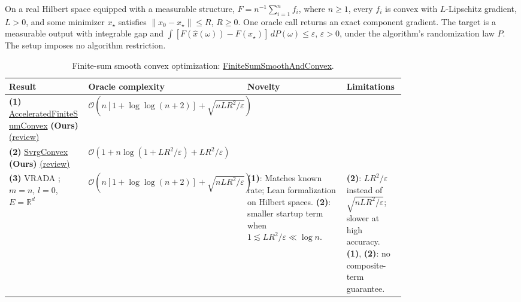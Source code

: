 \begin{table}[tp]
\centering
\caption{Finite-sum smooth convex optimization: \href{https://github.com/k3nfalt/longtails/blob/main/LongTails/Setups/FiniteSumSmoothAndConvex.lean}{FiniteSumSmoothAndConvex}.}\label{tab:FiniteSumSmoothAndConvex}
\parbox{\linewidth}{\footnotesize On a real Hilbert space equipped with a measurable structure, $F=n^{-1}\sum_{i=1}^n f_i$, where $n\ge1$, every $f_i$ is convex with $L$-Lipschitz gradient, $L>0$, and some minimizer $x_\star$ satisfies $\|x_0-x_\star\|\le R$, $R\ge0$. One oracle call returns an exact component gradient. The target is a measurable output with integrable gap and $\int [F(\widehat x(\omega))-F(x_\star)]\,dP(\omega)\le\varepsilon$, $\varepsilon>0$, under the algorithm's randomization law $P$. The setup imposes no algorithm restriction.}\par\smallskip
\begin{threeparttable}
\footnotesize
\setlength{\tabcolsep}{4pt}\renewcommand{\arraystretch}{1.25}
\begin{tabularx}{\linewidth}{@{}>{\raggedright\arraybackslash}p{0.20\linewidth}>{\raggedright\arraybackslash}p{0.32\linewidth}>{\raggedright\arraybackslash}p{0.25\linewidth}>{\raggedright\arraybackslash}X@{}}
\toprule
\textbf{Result} & \textbf{Oracle complexity} & \textbf{Novelty} & \textbf{Limitations} \\
\midrule
\textbf{(1)} \href{https://github.com/k3nfalt/longtails/blob/main/LongTails/Theorems/AcceleratedFiniteSumConvex.lean}{Accelerated\allowbreak Finite\allowbreak Sum\allowbreak Convex} \textbf{(Ours)} \href{https://github.com/k3nfalt/longtails/blob/main/scripts/reviews/AcceleratedFiniteSumConvex.md}{(review)} & $\mathcal{O}\!\left(n[1+\log\log(n+2)]+\sqrt{nLR^2/\varepsilon}\right)$ &  &  \\
\midrule
\textbf{(2)} \href{https://github.com/k3nfalt/longtails/blob/main/LongTails/Theorems/SvrgConvex.lean}{Svrg\allowbreak Convex} \textbf{(Ours)} \href{https://github.com/k3nfalt/longtails/blob/main/scripts/reviews/SvrgConvex.md}{(review)} & $\mathcal{O}\!\left(1+n\log(1+LR^2/\varepsilon)+LR^2/\varepsilon\right)$ &  &  \\
\midrule[1.2pt]
\textbf{(3)} VRADA \citep[Thm.~1]{fsSong2021V4}; $m=n$, $l=0$, $E=\mathbb R^d$ & $\mathcal{O}\!\left(n[1+\log\log(n+2)]+\sqrt{nLR^2/\varepsilon}\right)$ & \textbf{(1)}: Matches known rate; Lean formalization on Hilbert spaces. \textbf{(2)}: smaller startup term when $1\lesssim LR^2/\varepsilon\ll\log n$. & \textbf{(2)}: $LR^2/\varepsilon$ instead of $\sqrt{nLR^2/\varepsilon}$; slower at high accuracy. \textbf{(1)}, \textbf{(2)}: no composite-term guarantee. \\

\end{tabularx}
\end{threeparttable}
\end{table}
